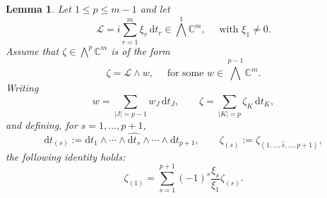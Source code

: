 \documentclass[12pt,reqno]{amsart}
\newtheorem{lemma}[theorem]{Lemma}
\theoremstyle{definition}
\numberwithin{equation}{section}
\begin{document}
\begin{lemma}\label{lem:combinatorial_identity}
	Let $1 \leq p \leq m-1$ and let
	\[
	\mathscr L
	=
	i\sum_{r=1}^m \xi_r\,\mathrm dt_r
	\in \textstyle\bigwedge^1 \mathbb C^m,
	\quad \mbox{ with } \xi_1 \neq 0.
	\]
	Assume that $\zeta \in \textstyle\bigwedge^p \mathbb C^m$ is of the form
	\[
	\zeta = \mathscr L \wedge w,
	\quad \mbox{ for some }
	w \in \textstyle\bigwedge^{p-1} \mathbb C^m.
	\]
	Writing
	\[
	w = \sum_{|J|=p-1} w_J \, \mathrm dt_J,
	\qquad
	\zeta = \sum_{|K|=p} \zeta_K \, \mathrm dt_K,
	\]
	and defining, for $s=1,\dots,p+1$,
	\[
	\mathrm dt_{(s)} := \mathrm dt_1 \wedge \cdots \wedge \widehat{\mathrm dt_s}
	\wedge \cdots \wedge \mathrm dt_{p+1},
	\qquad
	\zeta_{(s)} := \zeta_{(1,\dots,\widehat s,\dots,p+1)},
	\]
	the following identity holds:
	\begin{equation}\label{zeta_identity}
		\zeta_{(1)}
		=
		\sum_{s=1}^{p+1}
		(-1)^s
		\frac{\xi_s}{\xi_1}
		\zeta_{(s)}.
	\end{equation}
\end{lemma}
\end{document}
